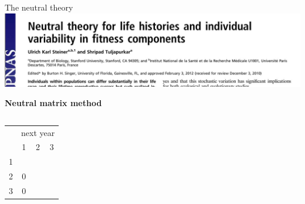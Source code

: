 \documentclass[10pt]{beamer}%
\begin{document}
\begin{frame}{The neutral theory}
\includegraphics[width=\textwidth]{Figures/NeutralTheory}

\textbf{Neutral matrix method}
\vspace{0.5cm}
\begin{columns}
\begin{column}[c]{0.5\textwidth}
\begin{table}
\begin{tabular}{c|c c c}
& \multicolumn{3}{c}{next year} \\
	& 1 & 2 & 3\\
	\hline
1	& \color{red!90}{0.9}	&	 \color{red!8}{0.08}	&	 \color{red!2}{0.02}	\\
2 & 0  	&	\color{red!70}{0.7}	&	 \color{red!30}{0.3}	\\
3 & 0  	&	 \color{red!20}{0.2}	&	\color{red!80}{0.8}	\\


\end{tabular}
\end{table}
\end{column}
\end{columns}
\end{frame}
\end{document}
